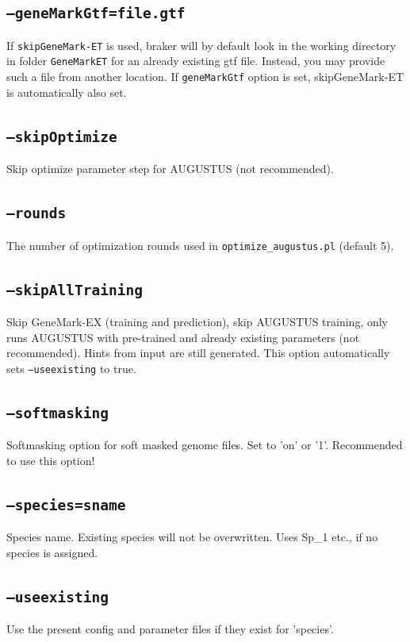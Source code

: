 \documentclass[a4paper,10pt]{report}
\begin{document}
\subsection{\texttt{--geneMarkGtf=file.gtf}}               If \texttt{skipGeneMark-ET} is used, braker will by default look in the 
                                         working directory in folder \texttt{GeneMarkET} for an already existing gtf
                                         file. Instead, you may provide such a file from another location.
                                         If \texttt{geneMarkGtf} option is set, skipGeneMark-ET is automatically also set.
\subsection{\texttt{--skipOptimize}}                       Skip optimize parameter step for AUGUSTUS (not recommended).
\subsection{\texttt{--rounds}}                             The number of optimization rounds used in \texttt{optimize\_augustus.pl} (default 5).

\subsection{\texttt{--skipAllTraining}}                    Skip GeneMark-EX (training and prediction), skip AUGUSTUS training,
                                         only runs AUGUSTUS with pre-trained and already
                                         existing parameters (not recommended). Hints from input are still generated.
                                         This option automatically sets \texttt{--useexisting} to true.
    \subsection{\texttt{--softmasking}}                        Softmasking option for soft masked genome files. Set to 'on' or '1'. Recommended to use this option!
    \subsection{\texttt{--species=sname}}                      Species name. Existing species will not be overwritten. 
                                         Uses Sp\_1 etc., if no species is assigned.                          
    \subsection{\texttt{--useexisting}}                        Use the present config and parameter files if they exist for 
                                         'species'.
\end{document}
